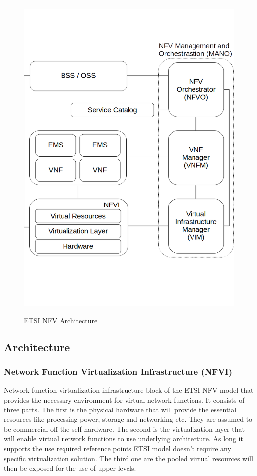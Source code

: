 \documentclass[12pt,oneandhalf,chaparabic,ceng,ms,eng,oneside,pntc]{gsufbe}
\makeatletter
\let\old@includegraphics\includegraphics
\renewcommand{\includegraphics}[2][,]{%
  \setbox9=\hbox{\old@includegraphics[#1]{#2}}%
  \ifdim\wd9>\textwidth
    \old@includegraphics[#1,width=\textwidth]{#2}%
  \else
    \old@includegraphics[#1]{#2}%
  \fi%
}
\makeatother
\begin{document}
\begin{figure}
\centering
\includegraphics[]{mano.png}
\caption{ETSI NFV Architecture}
\label{fig:mano}
\end{figure}

\subsection{Architecture}
\subsubsection{Network Function Virtualization Infrastructure (NFVI)}
Network function virtualization infrastructure block of the ETSI NFV model that provides the necessary
environment for virtual network functions.  It consists of three parts.  The first is the physical hardware
that will provide the essential resources like processing power, storage and networking etc.  They are
assumed to be commercial off the self hardware.  The second is the virtualization layer that will enable
virtual network functions to use underlying architecture.  As long it supports the use required reference
points ETSI model doesn't require any specific virtualization solution.  The third one
are the pooled virtual resources will then be exposed for the use of upper levels.
\end{document}
